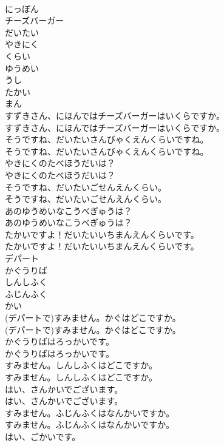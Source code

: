 \documentclass[8pt]{extreport}
\begin{document}
\begin{CJK}{UTF8}{min}
\\	にっぽん
\\	チーズバーガー
\\	だいたい
\\	やきにく
\\	くらい
\\	ゆうめい
\\	うし
\\	たかい
\\	まん
\\	すずきさん、にほんではチーズバーガーはいくらですか。	
\\	すずきさん、にほんではチーズバーガーはいくらですか。 
\\	そうですね、だいたいさんびゃくえんくらいですね。	
\\	そうですね、だいたいさんびゃくえんくらいですね。 
\\	やきにくのたべほうだいは？	
\\	やきにくのたべほうだいは？ 
\\	そうですね、だいたいごせんえんくらい。	
\\	そうですね、だいたいごせんえんくらい。 
\\	あのゆうめいなこうべぎゅうは？	
\\	あのゆうめいなこうべぎゅうは？ 
\\	たかいですよ！だいたいいちまんえんくらいです。	
\\	たかいですよ！だいたいいちまんえんくらいです。 
\\	デパート
\\	かぐうりば
\\	しんしふく
\\	ふじんふく
\\	かい
\\	(デパートで)すみません。かぐはどこですか。	
\\	(デパートで)すみません。かぐはどこですか。 
\\	かぐうりばはろっかいです。	
\\	かぐうりばはろっかいです。 
\\	すみません。しんしふくはどこですか。	
\\	すみません。しんしふくはどこですか。 
\\	はい、さんかいでございます。	
\\	はい、さんかいでございます。 
\\	すみません。ふじんふくはなんかいですか。	
\\	すみません。ふじんふくはなんかいですか。 
\\	はい、ごかいです。	

\end{CJK}
\end{document}
